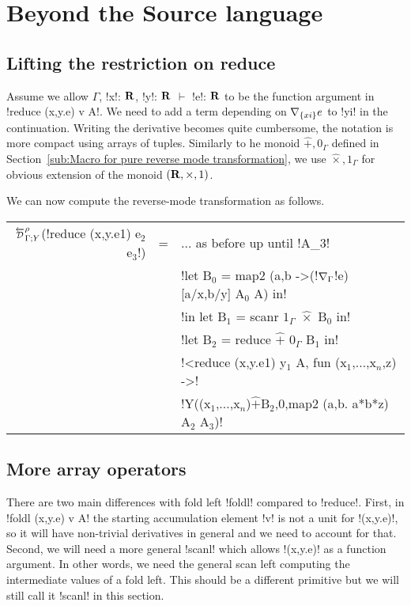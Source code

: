\section{Beyond the Source language}
\label{sec:generalization}

\subsection{Lifting the restriction on reduce}
\label{sub:Lifting the restriction on reduce}

Assume we allow $\Gamma$, !x!: $\mathbf{R}$, !y!: $\mathbf{R}$ $\vdash$ !e!: $\mathbf{R}$ to be the function argument in
!reduce (x,y.e) v A!. We need to add a term depending on $\nabla_{\{xi\}}e$ to !yi! in the continuation.
Writing the derivative becomes quite cumbersome, the notation is more compact using arrays of tuples. 
Similarly to he monoid $\widehat{+},0_\Gamma$ defined in Section~\ref{sub:Macro for pure reverse mode transformation},
we use $\widehat{\times},1_\Gamma$ for obvious extension of the monoid $(\mathbf{R},\times,1)$.

We can now compute the reverse-mode transformation as follows.
\begin{center}
\begin{tabular}{r c l}
$\directD{\rho}{\Gamma}{Y}$(!reduce (x,y.e1) e$_2$ e$_3$!) 
&=& $\ldots$ as before up until !A_$3$! \\
&& !let B$_0$ = map2 (a,b ->(!$\nabla_\Gamma$!e)[a/x,b/y] A$_0$ A) in!\\
&& !in let B$_1$ = scanr $1_\Gamma$ $\widehat{\times}$ B$_0$ in! \\
&& !let B$_2$ = reduce $\widehat{+}$ $0_\Gamma$ B$_1$ in! \\
&& !<reduce (x,y.e1) y$_1$ A, fun (x$_1$,$\ldots$,x$_n$,z) ->! \\
&& !Y((x$_1$,$\ldots$,x$_n$)$\widehat{+}$B$_2$,0,map2 (a,b. a*b*z) A$_2$ A$_3$)!
\end{tabular}
\end{center}

\subsection{More array operators}
\label{sub:Adding more array operators}

There are two main differences with fold left !foldl! compared to !reduce!. 
First, in !foldl (x,y.e) v A! the starting accumulation element !v! is not a unit for !(x,y.e)!,
so it will have non-trivial derivatives in general and we need to account for that.
Second, we will need a more general !scanl! which allows !(x,y.e)! as a function argument. 
In other words, we need the general scan left computing the intermediate values of a fold left.
This should be a different primitive but we will still call it !scanl! in this section.

